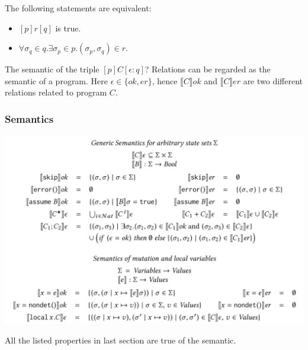 \documentclass[11pt]{beamer}
\begin{document}
\begin{frame}\frametitle{}

\begin{lemma}[Characterization]
The following statements are equivalent:
\begin{itemize}
\item $[p]r[q]$ is true.
\item $\forall \sigma_q \in q. \exists \sigma_p\in p. (\sigma_p,\sigma_q)\in r$.

\end{itemize}

\end{lemma}

The semantic of the triple $[p]C[\epsilon: q]$? Relations can be regarded as the semantic of a program. Here $\epsilon\in \{ok,er\}$, hence $\llbracket C\rrbracket ok$ and $\llbracket C \rrbracket er$ are two different relations related to program $C$.




\end{frame}

\begin{frame}
\begin{center}\frametitle{Semantics}
\includegraphics[scale = 0.3]{9.png}
\begin{theorem}
All the listed properties in last section are true of the semantic.

\end{theorem}
\end{center}
\end{frame}
\end{document}
